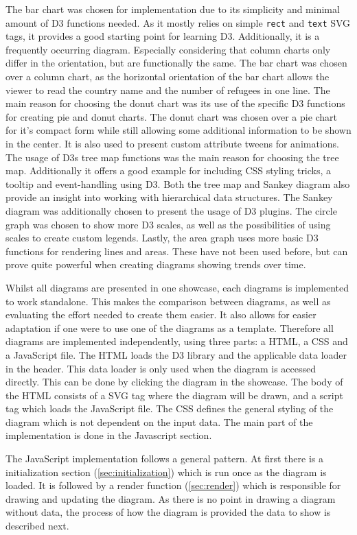 The bar chart was chosen for implementation due to its simplicity and minimal amount of D3 functions needed. As it mostly relies on simple \texttt{rect} and \texttt{text} SVG tags, it provides a good starting point for learning D3. Additionally, it is a frequently occurring diagram. Especially considering that column charts only differ in the orientation, but are functionally the same. The bar chart was chosen over a column chart, as the horizontal orientation of the bar chart allows the viewer to read the country name and the number of refugees in one line.
The main reason for choosing the donut chart was its use of the specific D3 functions for creating pie and donut charts. The donut chart was chosen over a pie chart for it's compact form while still allowing some additional information to be shown in the center. It is also used to present custom attribute tweens for animations.
The usage of D3s tree map functions was the main reason for choosing the tree map. Additionally it offers a good example for including CSS styling tricks, a tooltip and event-handling using D3.
Both the tree map and Sankey diagram also provide an insight into working with hierarchical data structures. The Sankey diagram was additionally chosen to present the usage of D3 plugins.
The circle graph was chosen to show more D3 scales, as well as the possibilities of using scales to create custom legends.
Lastly, the area graph uses more basic D3 functions for rendering lines and areas. These have not been used before, but can prove quite powerful when creating diagrams showing trends over time.

Whilst all diagrams are presented in one showcase, each diagrams is implemented to work standalone. This makes the comparison between diagrams, as well as evaluating the effort needed to create them easier. It also allows for easier adaptation if one were to use one of the diagrams as a template. Therefore all diagrams are implemented independently, using three parts: a HTML, a CSS and a JavaScript file. The HTML loads the D3 library and the applicable data loader in the header. This data loader is only used when the diagram is accessed directly. This can be done by clicking the diagram in the showcase. The body of the HTML consists of a SVG tag where the diagram will be drawn, and a script tag which loads the JavaScript file. The CSS defines the general styling of the diagram which is not dependent on the input data. The main part of the implementation is done in the Javascript section.

The JavaScript implementation follows a general pattern. At first there is a initialization section (\ref{sec:initialization}) which is run once as the diagram is loaded. It is followed by a render function (\ref{sec:render}) which is responsible for drawing and updating the diagram. As there is no point in drawing a diagram without data, the process of how the diagram is provided the data to show is described next.

